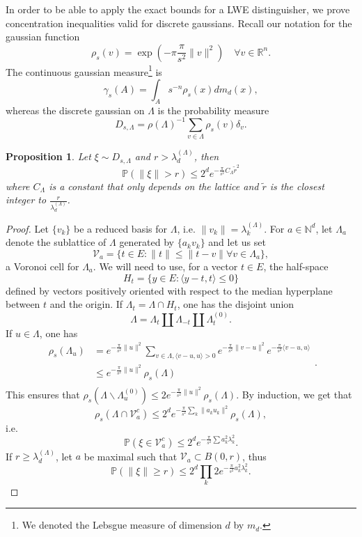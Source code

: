 \documentclass{article}
\newtheorem{proposition}{Proposition}
\begin{document}
In order to be able to apply the exact bounds for a LWE distinguisher, we prove concentration inequalities valid for discrete gaussians. Recall our notation for the gaussian function 
$$\rho_s(v)=\exp(-\pi \frac{\pi}{s^2}\|v\|^2 )\quad \forall v\in \mathbb R^n.$$
The continuous gaussian measure\footnote{We denoted the Lebsgue measure of dimension $d$ by $m_d$.} is 
$$\gamma_s(A) =  \int_A s^{-n}\rho_s(x)dm_d(x) ,$$
whereas the discrete gaussian on $\Lambda$ is the probability measure 
$$D_{s,\Lambda} = \rho(\Lambda )^{-1} \sum_{v\in \Lambda} \rho_s(v)\delta_v. $$

\begin{proposition}
Let $\xi \sim D_{s,\Lambda}$ and $r > \lambda_d^{(\Lambda)}$, then 
$$\mathbb P(\|\xi \|> r )\leq 2^de^{-\frac{\pi}{s^2} C_\Lambda \tilde r^2}$$
where $C_\Lambda$ is a constant that only depends on the lattice and $\tilde r$ is the closest integer to $\frac{r}{\lambda_d^{(\Lambda)}}$.
\end{proposition} 

\begin{proof}
Let $\{v_k\}$ be a reduced basis for $\Lambda$, i.e. $\|v_k\| = \lambda_k^{(\Lambda)}$. For $a\in \mathbb N^d$, let $\Lambda_a$ denote the sublattice of $\Lambda$ generated by $\{a_kv_k\}$  and let us set 
$$\mathcal V_a = \{t\in E : \|t\|\leq \|t-v\| \forall v\in \Lambda_a\}, $$
a Voronoi cell for $\Lambda_a$. We will need to use, for a vector $t\in E$, the half-space 
$$H_t = \{y \in E : \langle y-t , t\rangle \leq 0  \}$$ 
defined by vectors positively oriented with respect to the median hyperplane between $t$ and the origin. If $\Lambda_{t} =\Lambda\cap H_t$, one has the disjoint union
$$\Lambda = \Lambda_t \coprod \Lambda_{-t} \coprod \Lambda_t^{(0)}.$$
If $u\in \Lambda$, one has
\[\begin{split}
\rho_s(\Lambda_u) & = e^{-\frac{\pi}{s^2} \|u\|^2 }\sum_{v\in \Lambda , \langle v-u ,u\rangle >0 } e^{-\frac{\pi}{s^2} \|v - u \|^2}e^{-\frac{\pi}{s^2} \langle v-u,u\rangle} \\
		& \leq  e^{-\frac{\pi}{s^2} \|u\|^2 } \rho_s(\Lambda) \\ 
\end{split}.\]
This ensures that $\rho_s(\Lambda \backslash \Lambda_u^{(0)}) \leq 2e^{-\frac{\pi}{s^2} \|u\|^2} \rho_s(\Lambda) $. By induction, we get that
$$\rho_s(\Lambda \cap \mathcal V_a^c) \leq 2^d  e^{-\frac{\pi}{s^2} \sum_{k} \|a_ku_k\|^2}\rho_s(\Lambda) ,$$
i.e.
$$\mathbb P(\xi \in \mathcal V_a^c) \leq  2^d e^{-\frac{\pi}{s^2} \sum a_k^2\lambda_k^2} .$$
If $r\geq \lambda_d^{(\Lambda)}$, let $a$ be maximal such that $\mathcal V_a\subset B(0,r)$, thus
$$\mathbb P(\| \xi \| \geq r) \leq  2^d\prod_{k} 2e^{-\frac{\pi}{s^2} a_k^2\lambda_k^2} .$$
\end{proof}
\end{document}
